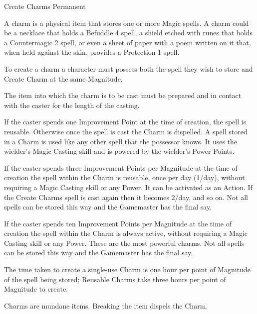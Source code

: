 \begin{rpg-spell}
{Create Charms}
{Permanent}

A charm is a physical item that stores one or more Magic spells. A charm could be a necklace that holds a Befuddle 4 spell, a shield etched with runes that holds a Countermagic 2 spell, or even a sheet of paper with a poem written on it that, when held against the skin, provides a Protection 1 spell.

\begin{rpg-list}
\item To create a charm a character must possess both the spell they wish to store and Create Charm at the same Magnitude.
\item The item into which the charm is to be cast must be prepared and in contact with the caster for the length of the casting.
\item If the caster spends one Improvement Point at the time of creation, the spell is reusable. Otherwise once the spell is cast the Charm is dispelled. A spell stored in a Charm is used like any other spell that the possessor knows. It uses the wielder’s Magic Casting skill and is powered by the wielder’s Power Points.
\item If the caster spends three Improvement Points per Magnitude at the time of creation the spell within the Charm is reusable, once per day (1/day), without requiring a Magic Casting skill or any Power. It can be activated as an Action. If the Create Charms spell is cast again then it becomes 2/day, and so on. Not all spells can be stored this way and the Gamemaster has the final say.
\item If the caster spends ten Improvement Points per Magnitude at the time of creation the spell within the Charm is always active, without requiring a Magic Casting skill or any Power. These are the most powerful charms. Not all spells can be stored this way and the Gamemaster has the final say.
\item The time taken to create a single-use Charm is one hour per point of Magnitude of the spell being stored; Reusable Charms take three hours per point of Magnitude to create.
\item Charms are mundane items. Breaking the item dispels the Charm.
\end{rpg-list}
\end{rpg-spell}


